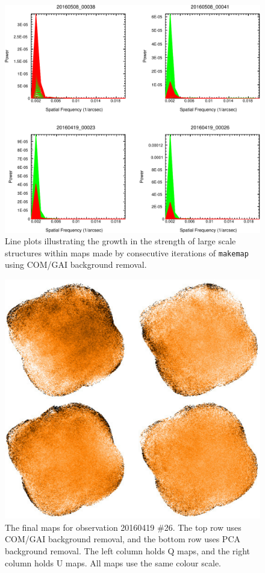 \documentclass[twoside,11pt]{starlink}
\begin{document}
\begin{figure}
\includegraphics[width=\columnwidth]{astmask2}
\caption{Line plots illustrating the growth in the strength of large
scale structures within maps made by consecutive iterations of
\texttt{makemap} using COM/GAI background removal.}
\label{fig:astmask2}
\end{figure}

\begin{figure}
\includegraphics[width=\columnwidth]{astmask3}
\caption{The final maps for observation 20160419 \#26. The top row uses
COM/GAI background removal, and the bottom row uses PCA background removal.
The left column holds Q maps, and the right column holds U maps. All maps
use the same colour scale.}
\label{fig:astmask3}
\end{figure}
\end{document}
